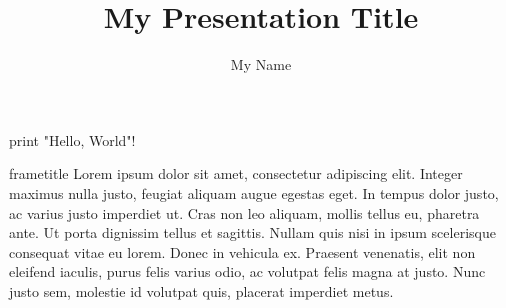 \documentclass{kgc}
\title{My Presentation Title}
\author{My Name}
\begin{document}
\begin{frame}
\end{frame}

\begin{frame}
\end{frame}

\begin{frame}[fragile]

\begin{code}
print "Hello, World"!
\end{code}

\end{frame}

\begin{frame}
\end{frame}

\begin{frame}{frametitle}
Lorem ipsum dolor sit amet, consectetur adipiscing elit. Integer maximus nulla justo, feugiat aliquam augue egestas eget. In tempus dolor justo, ac varius justo imperdiet ut. Cras non leo aliquam, mollis tellus eu, pharetra ante. Ut porta dignissim tellus et sagittis. Nullam quis nisi in ipsum scelerisque consequat vitae eu lorem. Donec in vehicula ex. Praesent venenatis, elit non eleifend iaculis, purus felis varius odio, ac volutpat felis magna at justo. Nunc justo sem, molestie id volutpat quis, placerat imperdiet metus.
\end{frame}


\end{document}

